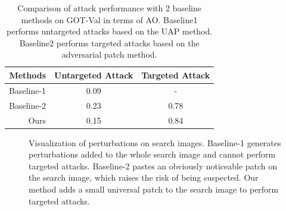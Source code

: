 \documentclass[journal]{IEEEtran}
\begin{document}
\begin{table}[t]
  \centering
  \caption{Comparison of attack performance with 2 baseline methods on GOT-Val in terms of AO. Baseline1 performs untargeted attacks based on the UAP \cite{UAP} method. Baseline2 performs targeted attacks based on the adversarial patch \cite{patch} method.}
  \begin{tabular}{@{}rcc@{}}
  \toprule
  Methods & Untargeted Attack & Targeted Attack \\ \midrule
  Baseline-1 \cite{UAP}  & 0.09          & -\\
  Baseline-2 \cite{patch}   & 0.23       & 0.78\\
  Ours & 0.15       & 0.84\\ \bottomrule
  \end{tabular}
  \label{tab:imperceptible}
\end{table}
  
\begin{figure}[t]
  \centering
  \caption{Visualization of perturbations on search images. Baseline-1 generates perturbations added to the whole search image and cannot perform targeted attacks. Baseline-2 pastes an obviously noticeable patch on the search image, which raises the risk of being suspected. Our method adds a small universal patch to the search image to perform targeted attacks.}
  \label{fig:imperceptible}
\end{figure}
\end{document}
